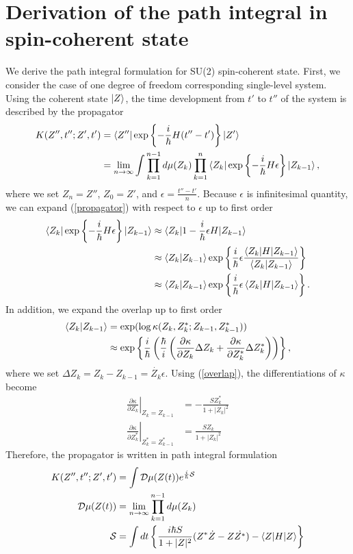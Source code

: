 \documentclass[11pt]{book} %
\begin{document}
\section{Derivation of the path integral in spin-coherent state}
We derive the path integral formulation for SU(2) spin-coherent state.
First, we consider the case of one degree of freedom corresponding single-level system.
Using the coherent state $\ket{Z}$, the time development from $t'$ to $t''$ of the system is described by the propagator
\begin{align}
  K(Z'',t'';Z',t') &= \braket{Z''|\exp \left\{-\frac{i}{\hbar}H(t''-t')\right\}|Z'} \\
  &= \lim_{n \to \infty} \int \prod_{k=1}^{n-1}d\mu(Z_k)\prod_{k=1}^{n}
  \braket{Z_k|\exp \left\{-\frac{i}{\hbar}H\epsilon\right\}|Z_{k-1}} ,
  \label{propagator}
\end{align}
where we set $Z_n=Z''$, $Z_0=Z'$, and $\epsilon=\frac{t''-t'}{n}$.
Because $\epsilon$ is infinitesimal quantity, we can expand (\ref{propagator}) with respect to $\epsilon$ up to first order
\begin{align}
  \braket{Z_k|\exp \left\{-\frac{i}{\hbar}H\epsilon\right\}|Z_{k-1}}
  &\approx \braket{Z_k|1-\frac{i}{\hbar}\epsilon H|Z_{k-1}} \nonumber \\
  &\approx \braket{Z_k|Z_{k-1}}\exp\left\{\frac{i}{\hbar}\epsilon
  \frac{\braket{Z_k|H|Z_{k-1}}}{\braket{Z_k|Z_{k-1}}}\right\} \nonumber \\
  &\approx \braket{Z_k|Z_{k-1}}\exp\left\{\frac{i}{\hbar}\epsilon
  \braket{Z_k|H|Z_{k-1}}\right\} .
\end{align}
In addition, we expand the overlap up to first order
\begin{align}
  \braket{Z_k|Z_{k-1}} &= \exp (\log \kappa(Z_k,Z_k^*;Z_{k-1},Z_{k-1}^*)) \nonumber \\
  &\approx \exp \left\{ \frac{i}{\hbar} \left(\frac{\hbar}{i} \left( 
  \frac{\partial \kappa}{\partial Z_k}\Delta Z_k + \frac{\partial \kappa}{\partial Z_k^*}\Delta Z_k^*
  \right) \right) \right\} ,
\end{align}
where we set $\Delta Z_k = Z_k - Z_{k-1} = \dot{Z_k}\epsilon$.
Using (\ref{overlap}), the differentiations of $\kappa$ become
\begin{align}
  \left. \frac{\partial \kappa}{\partial Z_k} \right|_{Z_k=Z_{k-1}} &= -\frac{SZ_k^*}{1+|Z_k|^2}\\
  \left. \frac{\partial \kappa}{\partial Z_k^*} \right|_{Z_k^*=Z_{k-1}^*} &= \frac{SZ_k}{1+|Z_k|^2}
\end{align}
Therefore, the propagator is written in path integral formulation
\begin{align}
    K(Z'',t'';Z',t') &= \int \mathcal{D}\mu(Z(t))e^{\frac{i}{\hbar}\mathcal{S}} \\
     \mathcal{D}\mu(Z(t)) &= \lim_{n \to \infty} \prod_{k=1}^{n-1}d\mu(Z_k) \\
    \mathcal{S} &= \int dt \left\{ \frac{i\hbar S}{1+|Z|^2}(Z^*\dot{Z}-Z\dot{Z^*})
    -\braket{Z|H|Z} \right\}
\end{align}
\end{document}
